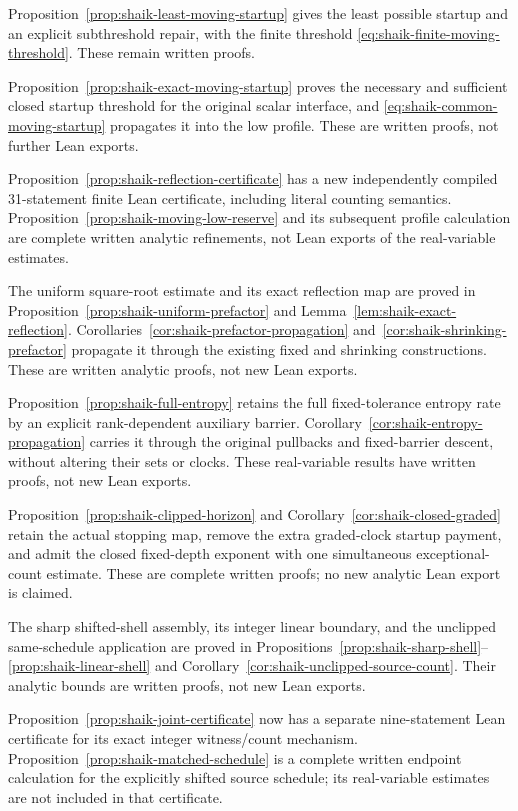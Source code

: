 \documentclass[11pt]{article}
\theoremstyle{remark}\newtheorem{remark}[proposition]{Remark}
\begin{document}
Proposition~\ref{prop:shaik-least-moving-startup} gives the least possible
startup and an explicit subthreshold repair, with the finite threshold
\eqref{eq:shaik-finite-moving-threshold}. These remain written proofs.

Proposition~\ref{prop:shaik-exact-moving-startup} proves the necessary
and sufficient closed startup threshold for the original scalar interface,
and \eqref{eq:shaik-common-moving-startup} propagates it into the low profile.
These are written proofs, not further Lean exports.

Proposition~\ref{prop:shaik-reflection-certificate} has a new independently
compiled 31-statement finite Lean certificate, including literal counting
semantics. Proposition~\ref{prop:shaik-moving-low-reserve} and its subsequent
profile calculation are complete written analytic refinements, not Lean
exports of the real-variable estimates.

The uniform square-root estimate and its exact reflection map are proved in
Proposition~\ref{prop:shaik-uniform-prefactor} and
Lemma~\ref{lem:shaik-exact-reflection}. Corollaries~\ref{cor:shaik-prefactor-propagation}
and~\ref{cor:shaik-shrinking-prefactor} propagate it through the existing
fixed and shrinking constructions. These are written analytic proofs,
not new Lean exports.

Proposition~\ref{prop:shaik-full-entropy} retains the full fixed-tolerance
entropy rate by an explicit rank-dependent auxiliary barrier.
Corollary~\ref{cor:shaik-entropy-propagation} carries it through the
original pullbacks and fixed-barrier descent, without altering their
sets or clocks. These real-variable results have written proofs,
not new Lean exports.

Proposition~\ref{prop:shaik-clipped-horizon} and
Corollary~\ref{cor:shaik-closed-graded} retain the actual stopping map,
remove the extra graded-clock startup payment, and admit the closed
fixed-depth exponent with one simultaneous exceptional-count estimate.
These are complete written proofs; no new analytic Lean export is claimed.

The sharp shifted-shell assembly, its integer linear boundary, and the
unclipped same-schedule application are proved in
Propositions~\ref{prop:shaik-sharp-shell}--\ref{prop:shaik-linear-shell}
and Corollary~\ref{cor:shaik-unclipped-source-count}.
Their analytic bounds are written proofs, not new Lean exports.

Proposition~\ref{prop:shaik-joint-certificate} now has a separate
nine-statement Lean certificate for its exact integer witness/count
mechanism. Proposition~\ref{prop:shaik-matched-schedule} is a complete
written endpoint calculation for the explicitly shifted source schedule;
its real-variable estimates are not included in that certificate.
\end{document}
